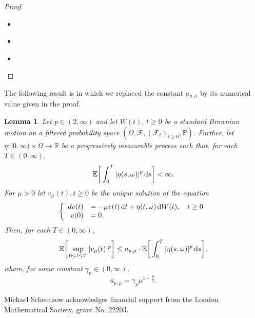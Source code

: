 \documentclass[sn-mathphys-num]{sn-jnl}
\newtheorem{cor}[thm]{Corollary}
\newtheorem{lem}[thm]{Lemma}
\theoremstyle{definition}
\newcommand{\scr}[1]{\mathscr #1}
\numberwithin{equation}{section} \theoremstyle{remark}
\renewcommand{\d}{\hbox{d}}
\def\R{\mathbb R}
\def\d{\text{\rm{d}}} \def\bb{\beta} \def\aa{\alpha} \def\D{\scr D}
\def\F{\scr F}
\def\P{\mathbb P}
\newcommand{\1}{\mathbbm{1}}
\begin{document}
\begin{appendices}
\begin{proof} \indent

  \begin{itemize}
    \item[a)] \cite[Proposition 5.5.22d)]{KS}
    \item[b)] \cite[(5.5.55),(5.5.59)]{KS}
      \item[c)] \cite[Theorem 5.5.29, Proposition 5.5.32]{KS}
      \end{itemize}
\end{proof}

The following result is \cite[Lemma 2.2]{ESV} in which we replaced the constant $a_{p,\mu}$ by its numerical value given in the proof. 
\begin{lem}\label{ESVlemma}
  Let $p\in (2,\infty)$ and let $W(t),\,t \geq 0$ be a standard Brownian motion on a filtered probability space $(\Omega,\F,(\F_t)_{t \geq 0},\P)$. Further, let $\eta:[0,\infty)\times \Omega \to \R$
  be a progressively measurable process such that, for each $T \in (0,\infty)$,
  $$
\E \bigg[\int_0^T|\eta(s,\omega)|^p\,\d s\bigg]<\infty.
$$
For $\mu>0$ let $v_\mu(t), t\geq 0$ be the unique solution of the equation
\begin{equation*}
\left\{
  \begin{array}{rl}
    dv(t)&=-\mu v(t)\,\d t + \eta(t,\omega) \,\d W(t), \quad t\geq 0\\
    v(0)&=0. 
  \end{array}
  \right.
\end{equation*}
Then, for each $T \in (0,\infty)$,
$$
\E \bigg[ \sup_{0 \leq t \leq T}|v_\mu(t)|^p\bigg] \leq a_{p,\mu}\cdot\E \bigg[ \int_0^T|\eta(s,\omega)|^p\,\d s\bigg],
$$
where, for some constant $\gamma_p\in (0,\infty)$,
$$
a_{p,\mu}=\gamma_p\mu^{1-\frac p2}.
$$
\end{lem}

\end{appendices}



  

Michael Scheutzow acknowledges financial
support from the London Mathematical Society, grant No. 22203.


\end{document}
